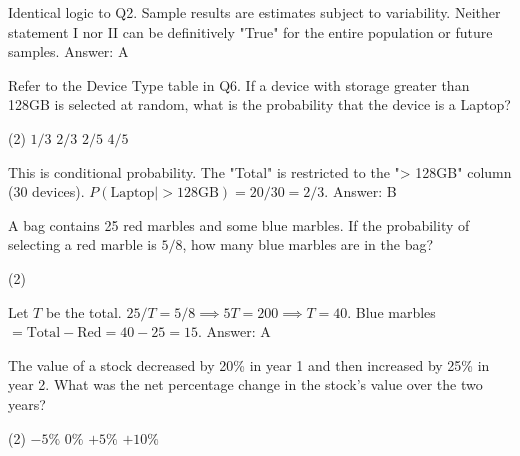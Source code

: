 \documentclass[11pt,paper=a4,answers]{exam}
\begin{document}
\begin{questions}
\begin{solution}
Identical logic to Q2. Sample results are estimates subject to variability. Neither statement I nor II can be definitively "True" for the entire population or future samples.
\vspace{5pt}
Answer: \colorbox{yellow!100}{A}
\end{solution}

\vspace{1cm}

\question
Refer to the Device Type table in Q6. If a device with storage greater than 128GB is selected at random, what is the probability that the device is a Laptop?
\begin{tasks}(2)
    \task $1/3$ \task $2/3$ \task $2/5$ \task $4/5$
\end{tasks}

\begin{solution}
This is conditional probability. The "Total" is restricted to the "> 128GB" column (30 devices).
\vspace{5pt}
$P(\text{Laptop} | > 128\text{GB}) = 20 / 30 = 2/3$.
\vspace{5pt}
Answer: \colorbox{yellow!100}{B}
\end{solution}

\vspace{1cm}

\question
A bag contains 25 red marbles and some blue marbles. If the probability of selecting a red marble is $5/8$, how many blue marbles are in the bag?
\begin{tasks}(2)
       
\end{tasks}

\begin{solution}
Let $T$ be the total. $25/T = 5/8 \implies 5T = 200 \implies T = 40$.
\vspace{5pt}
Blue marbles $= \text{Total} - \text{Red} = 40 - 25 = 15$.
\vspace{5pt}
Answer: \colorbox{yellow!100}{A}
\end{solution}

\vspace{1cm}

\question
The value of a stock decreased by 20\% in year 1 and then increased by 25\% in year 2. What was the net percentage change in the stock's value over the two years?
\begin{tasks}(2)
    \task $-5\%$ \task $0\%$ \task $+5\%$ \task $+10\%$
\end{tasks}


\end{questions}
\end{document}
